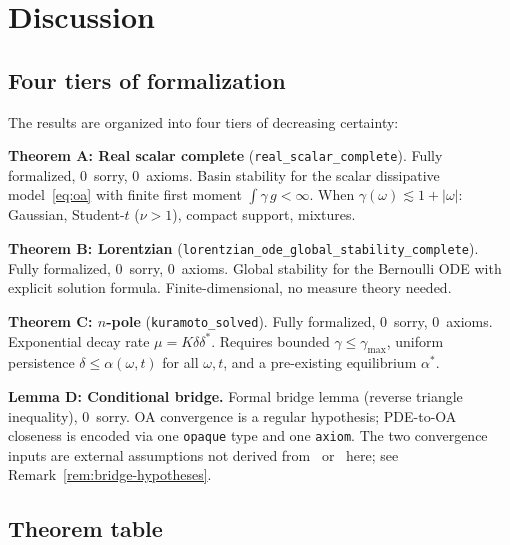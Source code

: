 \documentclass[11pt,a4paper]{article}
\theoremstyle{definition}
\begin{document}
\section{Discussion}\label{sec:discussion}

\subsection{Four tiers of formalization}

The results are organized into four tiers of decreasing certainty:

\medskip
\noindent\textbf{Theorem A: Real scalar complete} (\texttt{real\_scalar\_complete}). Fully formalized, 0~sorry, 0~axioms. Basin stability for the scalar dissipative model~\eqref{eq:oa} with finite first moment $\int \gamma\,g < \infty$. When $\gamma(\omega) \lesssim 1 + |\omega|$: Gaussian, Student-$t$ ($\nu > 1$), compact support, mixtures.

\medskip
\noindent\textbf{Theorem B: Lorentzian} (\texttt{lorentzian\_ode\_global\_stability\_complete}). Fully formalized, 0~sorry, 0~axioms. Global stability for the Bernoulli ODE with explicit solution formula. Finite-dimensional, no measure theory needed.

\medskip
\noindent\textbf{Theorem C: $n$-pole} (\texttt{kuramoto\_solved}). Fully formalized, 0~sorry, 0~axioms. Exponential decay rate $\mu = K\delta\delta^*$. Requires bounded $\gamma \leq \gamma_{\max}$, uniform persistence $\delta \leq \alpha(\omega,t)$ for all $\omega,t$, and a pre-existing equilibrium $\alpha^*$.

\medskip
\noindent\textbf{Lemma D: Conditional bridge.} Formal bridge lemma (reverse triangle inequality), 0~sorry. OA convergence is a regular hypothesis; PDE-to-OA closeness is encoded via one \texttt{opaque} type and one \texttt{axiom}. The two convergence inputs are external assumptions not derived from~\cite{dietert2017} or~\cite{dietert-fernandez2018} here; see Remark~\ref{rem:bridge-hypotheses}.

\subsection{Theorem table}
\end{document}
